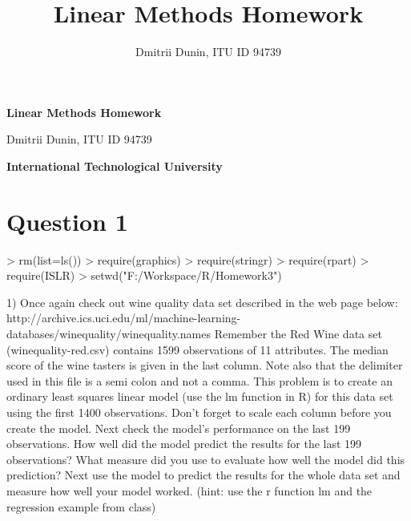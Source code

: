 \documentclass{article}
\title{Linear Methods Homework}
\author{Dmitrii Dunin, ITU ID 94739}
\begin{document}

\begin{center}
{\bf\Large Linear Methods Homework}
\end{center}
\begin{center}
{\Large Dmitrii Dunin, ITU ID 94739}
\end{center}
\begin{center}
{\bf\Large International Technological University}
\end{center}

\section*{Question 1}

\begin{Schunk}
\begin{Sinput}
> rm(list=ls())
> require(graphics)
> require(stringr)
> require(rpart)
> require(ISLR)
> setwd("F:/Workspace/R/Homework3")
\end{Sinput}
\end{Schunk}

1) Once again check out wine quality data set described in the web page
below:
http://archive.ics.uci.edu/ml/machine-learning-databases/winequality/winequality.names
Remember the Red Wine data set (winequality-red.csv) contains 1599
observations of 11 attributes. The median score of the wine tasters is given in
the last column. Note also that the delimiter used in this file is a semi colon
and not a comma. This problem is to create an ordinary least squares linear
model (use the lm function in R) for this data set using the first 1400
observations. Don't forget to scale each column before you create the model.
Next check the model's performance on the last 199 observations. How well
did the model predict the results for the last 199 observations? What measure
did you use to evaluate how well the model did this prediction? Next use the
model to predict the results for the whole data set and measure how well your
model worked. (hint: use the r function lm and the regression example from
class)
\end{document}
